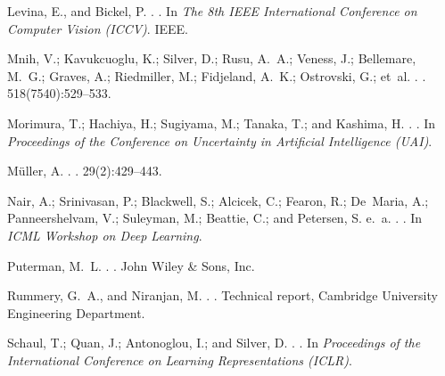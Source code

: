 \documentclass[letterpaper]{article}
\begin{document}
\begin{thebibliography}{}
Levina, E., and Bickel, P.
.
.
\newblock In {\em The 8th IEEE International Conference on Computer Vision
  (ICCV)}.
\newblock IEEE.

Mnih, V.; Kavukcuoglu, K.; Silver, D.; Rusu, A.~A.; Veness, J.; Bellemare,
  M.~G.; Graves, A.; Riedmiller, M.; Fidjeland, A.~K.; Ostrovski, G.; et~al.
.
.
 518(7540):529--533.

Morimura, T.; Hachiya, H.; Sugiyama, M.; Tanaka, T.; and Kashima, H.
.
.
\newblock In {\em Proceedings of the Conference on Uncertainty in Artificial
  Intelligence (UAI)}.

M{\"u}ller, A.
.
.
 29(2):429--443.

Nair, A.; Srinivasan, P.; Blackwell, S.; Alcicek, C.; Fearon, R.; De~Maria, A.;
  Panneershelvam, V.; Suleyman, M.; Beattie, C.; and Petersen, S. e.~a.
.
.
\newblock In {\em ICML Workshop on Deep Learning}.

Puterman, M.~L.
.
.
\newblock John Wiley \& Sons, Inc.

Rummery, G.~A., and Niranjan, M.
.
.
\newblock Technical report, Cambridge University Engineering Department.

Schaul, T.; Quan, J.; Antonoglou, I.; and Silver, D.
.
.
\newblock In {\em Proceedings of the International Conference on Learning
  Representations (ICLR)}.


\end{thebibliography}
\end{document}
